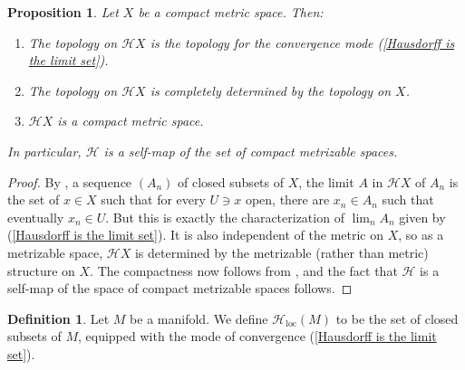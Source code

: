 \documentclass[reqno,11pt]{amsart}
\DeclareMathOperator{\dist}{dist}
\newcommand{\Hypspace}{\mathscr H}
\newcommand{\diam}{\mathrm{diam}}
\newcommand{\loc}{\mathrm{loc}}
\newtheorem{proposition}[theorem]{Proposition}
\theoremstyle{definition}
\newtheorem{definition}[theorem]{Definition}
\numberwithin{equation}{section}
\begin{document}
\begin{proposition}\label{Hausdorff on a CMS}
Let $X$ be a compact metric space. Then:
\begin{enumerate}
\item The topology on $\Hypspace X$ is the topology for the convergence mode (\ref{Hausdorff is the limit set}).
\item The topology on $\Hypspace X$ is completely determined by the topology on $X$.
\item $\Hypspace X$ is a compact metric space.
\end{enumerate}
In particular, $\Hypspace$ is a self-map of the set of compact metrizable spaces.
\end{proposition}
\begin{proof}
By \cite[Theorem 4.11]{nadler2017continuum}, a sequence $(A_n)$ of closed subsets of $X$, the limit $A$ in $\Hypspace X$ of $A_n$ is the set of $x \in X$ such that for every $U \ni x$ open, there are $x_n \in A_n$ such that eventually $x_n \in U$.
But this is exactly the characterization of $\lim_n A_n$ given by (\ref{Hausdorff is the limit set}).
It is also independent of the metric on $X$, so as a metrizable space, $\Hypspace X$ is determined by the metrizable (rather than metric) structure on $X$.
The compactness now follows from \cite[Theorem 4.17]{nadler2017continuum}, and the fact that $\Hypspace$ is a self-map of the space of compact metrizable spaces follows.
\end{proof}

\begin{definition}
Let $M$ be a manifold. We define $\Hypspace_\loc(M)$ to be the set of closed subsets of $M$, equipped with the mode of convergence (\ref{Hausdorff is the limit set}).
\end{definition}

\end{document}
